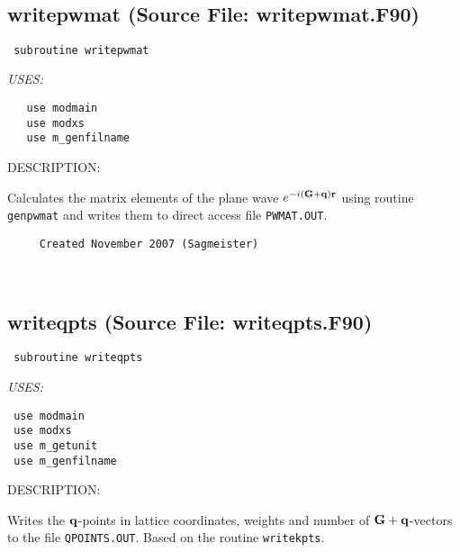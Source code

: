 \documentclass[11pt]{article}
\begin{document}

 
 
\mbox{}\hrulefill\ 
 
\subsection{writepwmat (Source File: writepwmat.F90)}


\begin{verbatim} subroutine writepwmat\end{verbatim}{\em USES:}
\begin{verbatim}   use modmain
   use modxs
   use m_genfilname\end{verbatim}
{\sf DESCRIPTION:\\ }


     Calculates the matrix elements of the plane wave
     $e^{-i({\bf G}+{\bf q}){\bf r}}$
     using routine {\tt genpwmat} and writes them to
     direct access file {\tt PWMAT.OUT}.
  
\begin{verbatim}     Created November 2007 (Sagmeister)\end{verbatim}


 
 
\mbox{}\hrulefill\ 
 
\subsection{writeqpts (Source File: writeqpts.F90)}


\begin{verbatim} subroutine writeqpts\end{verbatim}{\em USES:}
\begin{verbatim} use modmain
 use modxs
 use m_getunit
 use m_genfilname\end{verbatim}
{\sf DESCRIPTION:\\ }


     Writes the ${\bf q}$-points in lattice coordinates, weights and number of
     ${\bf G+q}$-vectors to the file {\tt QPOINTS.OUT}. Based on the routine 
     {\tt writekpts}.
  
\end{document}
